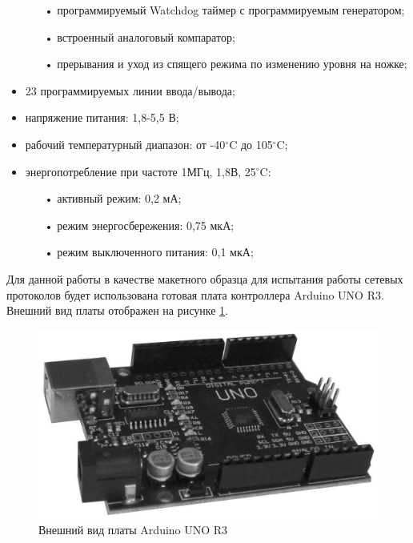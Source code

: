 \begin{itemize}
\begin{itemize}
		\item[•] программируемый Watchdog таймер с программируемым генератором;
		\item[•] встроенный аналоговый компаратор;
		\item[•] прерывания и уход из спящего режима по изменению уровня на ножке;
	\end{itemize}
	\item 23 программируемых линии ввода/вывода;
	\item напряжение питания: 1,8-5,5 В;
	\item рабочий температурный диапазон: от -40$^{\circ}$C до 105$^{\circ}$C;
	\item энергопотребление при частоте 1МГц, 1,8В, 25$^{\circ}$C:
	\begin{itemize}
		\item[•] активный режим: 0,2 мА;
		\item[•] режим энергосбережения: 0,75 мкА;
		\item[•] режим выключенного питания: 0,1 мкА;
	\end{itemize}
\end{itemize}

Для данной работы в качестве макетного образца для испытания работы сетевых протоколов будет использована готовая плата контроллера Arduino UNO R3. Внешний вид платы отображен на рисунке \ref{fig:arduino}.

\begin{figure}[h!]
	\centering
		\includegraphics[scale=0.56]{img/arduino_uno_r3.jpg}
	\caption{Внешний вид платы Arduino UNO R3\label{fig:arduino}}
\end{figure}

